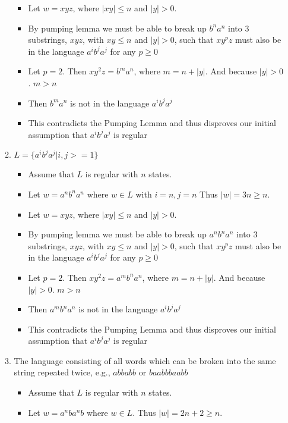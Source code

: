\begin{enumerate}
\begin{enumerate}
\begin{itemize}
		\item Let $w = xyz$, where $|xy| \leq n$ and $|y| > 0$.
		
		\item By pumping lemma we must be able to break up $b^na^n$ into 3 substrings, $xyz$, with $xy \leq n$ and $|y| > 0$, such that $xy^pz$ must also be in the language $a^ib^ja^j$ for any $p \geq 0$
		
		\item Let $p = 2$. Then $xy^2z = b^ma^n$, where $m = n + |y|$.  And because $|y| > 0$. $m>n$
		
		\item Then $b^ma^n$ is not in the language $a^ib^ja^j$
		
		\item This contradicts the Pumping Lemma and thus disproves our initial assumption that $a^ib^ja^j$ is regular
		
	\end{itemize}
	
	\item $L = \{a^ib^ja^j | i , j >=1\}$
  	\begin{itemize}
		\item 	Assume that $L$ is regular with $n$ states.  	
		\item Let $w = a^nb^na^n$ where $w \in L$ with $i=n, j=n$ Thus $|w| = 3n  \geq n$.
		
		\item Let $w = xyz$, where $|xy| \leq n$ and $|y| > 0$.
		
		\item By pumping lemma we must be able to break up $a^nb^na^n$ into 3 substrings, $xyz$, with $xy \leq n$ and $|y| > 0$, such that $xy^pz$ must also be in the language $a^ib^ja^j$ for any $p \geq 0$
		
		\item Let $p = 2$. Then $xy^2z = a^mb^na^n$, where $m = n + |y|$.  And because $|y| > 0$. $m>n$
		
		\item Then $a^mb^na^n$ is not in the language $a^ib^ja^j$
		
		\item This contradicts the Pumping Lemma and thus disproves our initial assumption that $a^ib^ja^j$ is regular
		
	\end{itemize}
	
	\item The language consisting of all words which can be broken into the same string repeated twice, e.g., $abbabb$ or $baabbbaabb$
	  	\begin{itemize}
		\item 	Assume that $L$ is regular with $n$ states.  	
		\item Let $w = a^nba^nb$ where $w \in L$.  Thus $|w| = 2n + 2  \geq n$.
		

\end{itemize}
\end{enumerate}
\end{enumerate}
